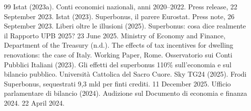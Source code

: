 \documentclass[11pt,a4paper]{article}
\begin{document}
\begin{thebibliography}{99}
 Istat (2023a). Conti economici nazionali, anni 2020--2022. Press release, 22 September 2023.
 Istat (2023). Superbonus, il parere Eurostat. Press note, 26 September 2023.
 Liberi oltre le illusioni (2025). Superbonus: cosa dice realmente il Rapporto UPB 2025? 23 June 2025.
 Ministry of Economy and Finance, Department of the Treasury (n.d.). The effects of tax incentives for dwelling renovations: the case of Italy. Working Paper, Rome.
 Osservatorio sui Conti Pubblici Italiani (2023). Gli effetti del superbonus 110\% sull'economia e sul bilancio pubblico. Università Cattolica del Sacro Cuore.
 Sky TG24 (2025). Frodi Superbonus, sequestrati 9,3 mld per finti crediti. 11 December 2025.
 Ufficio parlamentare di bilancio (2024). Audizione sul Documento di economia e finanza 2024. 22 April 2024.
\end{thebibliography}
\end{document}
